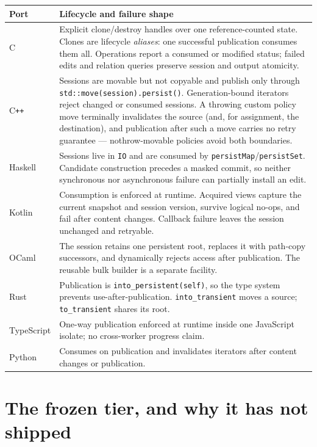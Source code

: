 \documentclass[11pt,twoside,openright]{book}
\makeatletter
\newcommand{\code}[1]{\texorpdfstring{\textcolor{d7ink}{\texttt{#1}}}{#1}}
\newenvironment{d7table}[1]
  {\par\vspace{3pt}\small
   \setlength{\LTpre}{4pt}\setlength{\LTpost}{4pt}
   \begin{longtable}{@{}%
     >{\raggedright\arraybackslash}p{#1\textwidth}%
     @{\hspace{10pt}}%
     >{\raggedright\arraybackslash}p{\dimexpr\textwidth-#1\textwidth-10pt\relax}@{}}}
  {\end{longtable}}
\newcommand{\thead}[1]{\sffamily\bfseries\footnotesize\color{d7ink}#1}
\makeatother
\begin{document}
\begin{d7table}{0.13}
\toprule
\thead{Port} & \thead{Lifecycle and failure shape} \\
\midrule
C           & Explicit clone/destroy handles over one reference-counted state.
Clones are lifecycle \emph{aliases}: one successful publication consumes them
all. Operations report a consumed or modified status; failed edits and relation
queries preserve session and output atomicity. \\
C\texttt{++} & Sessions are movable but not copyable and publish only through
\code{std::move(session).persist()}. Generation-bound iterators reject changed
or consumed sessions. A throwing custom policy move terminally invalidates the
source (and, for assignment, the destination), and publication after such a move
carries no retry guarantee --- nothrow-movable policies avoid both boundaries. \\
Haskell     & Sessions live in \code{IO} and are consumed by
\code{persistMap}/\code{persistSet}. Candidate construction precedes a masked
commit, so neither synchronous nor asynchronous failure can partially install an
edit. \\
Kotlin      & Consumption is enforced at runtime. Acquired views capture the
current snapshot and session version, survive logical no-ops, and fail after
content changes. Callback failure leaves the session unchanged and retryable. \\
OCaml       & The session retains one persistent root, replaces it with path-copy
successors, and dynamically rejects access after publication. The reusable bulk
builder is a separate facility. \\
Rust        & Publication is \code{into\_persistent(self)}, so the type system
prevents use-after-publication. \code{into\_transient} moves a source;
\code{to\_transient} shares its root. \\
TypeScript  & One-way publication enforced at runtime inside one JavaScript
isolate; no cross-worker progress claim. \\
Python      & Consumes on publication and invalidates iterators after content
changes or publication. \\
\bottomrule
\end{d7table}

\section{The frozen tier, and why it has not shipped}
\end{document}

